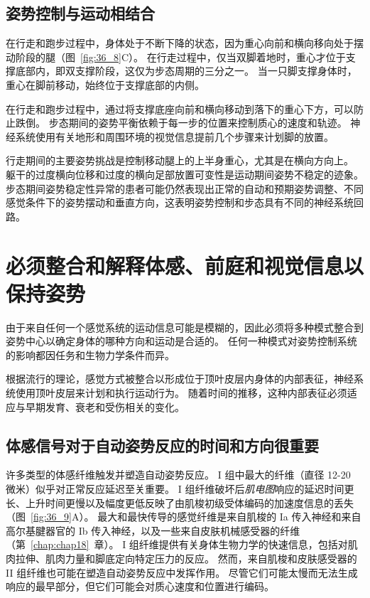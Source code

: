 \subsection{姿势控制与运动相结合}

在行走和跑步过程中，身体处于不断下降的状态，因为重心向前和横向移向处于摆动阶段的腿（图~\ref{fig:36_8}C）。
在行走过程中，仅当双脚着地时，重心才位于支撑底部内，即双支撑阶段，这仅为步态周期的三分之一。
当一只脚支撑身体时，重心在脚前移动，始终位于支撑底部的内侧。


在行走和跑步过程中，通过将支撑底座向前和横向移动到落下的重心下方，可以防止跌倒。
步态期间的姿势平衡依赖于每一步的位置来控制质心的速度和轨迹。
神经系统使用有关地形和周围环境的视觉信息提前几个步骤来计划脚的放置。


行走期间的主要姿势挑战是控制移动腿上的上半身重心，尤其是在横向方向上。
躯干的过度横向位移和过度的横向足部放置可变性是运动期间姿势不稳定的迹象。
步态期间姿势稳定性异常的患者可能仍然表现出正常的自动和预期姿势调整、不同感觉条件下的姿势摆动和垂直方向，这表明姿势控制和步态具有不同的神经系统回路。



\section{必须整合和解释体感、前庭和视觉信息以保持姿势}

由于来自任何一个感觉系统的运动信息可能是模糊的，因此必须将多种模式整合到姿势中心以确定身体的哪种方向和运动是合适的。
任何一种模式对姿势控制系统的影响都因任务和生物力学条件而异。


根据流行的理论，感觉方式被整合以形成位于顶叶皮层内身体的内部表征，神经系统使用顶叶皮层来计划和执行运动行为。
随着时间的推移，这种内部表征必须适应与早期发育、衰老和受伤相关的变化。



\subsection{体感信号对于自动姿势反应的时间和方向很重要}

许多类型的体感纤维触发并塑造自动姿势反应。
I 组中最大的纤维（直径 12-20 微米）似乎对正常反应延迟至关重要。
I 组纤维破坏后\textit{肌电图}响应的延迟时间更长、上升时间更慢以及幅度更低反映了由肌梭初级受体编码的加速度信息的丢失（图~\ref{fig:36_9}A）。
最大和最快传导的感觉纤维是来自肌梭的 Ia 传入神经和来自高尔基腱器官的 Ib 传入神经，以及一些来自皮肤机械感受器的纤维（第~\ref{chap:chap18}~章）。
I 组纤维提供有关身体生物力学的快速信息，包括对肌肉拉伸、肌肉力量和脚底定向特定压力的反应。
然而，来自肌梭和皮肤感受器的 II 组纤维也可能在塑造自动姿势反应中发挥作用。
尽管它们可能太慢而无法生成响应的最早部分，但它们可能会对质心速度和位置进行编码。


